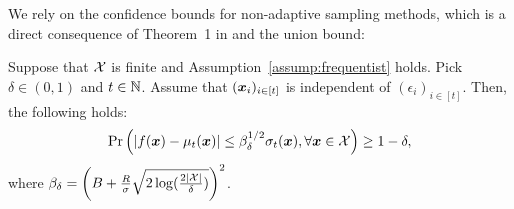We rely on the confidence bounds for non-adaptive sampling methods, which is a direct consequence of Theorem~1 in \citet{vakili2021-optimal} and the union bound:
\begin{lemma}
    Suppose that ${\cal X}$ is finite and Assumption~\ref{assump:frequentist} holds.
    Pick $\delta \in (0, 1)$ and $t \in \mathbb{N}$.
    Assume that $(\boldsymbol{x}_i)_{i \in [t]}$ is independent of $(\epsilon_i)_{i \in [t]}$.
    Then, the following holds:
    \begin{align*}
        \Pr \left( |f(\boldsymbol{x}) - \mu_{t}(\boldsymbol{x}) | \leq \beta^{1/2}_{\delta} \sigma_{t}(\boldsymbol{x}), \forall \boldsymbol{x} \in {\cal X} \right)
        \geq 1 - \delta,
    \end{align*}
    where $\beta_{\delta} = \left( B + \frac{R}{\sigma} \sqrt{2 \log ( \frac{2 |{\cal X}|}{\delta})} \right)^2$.
    \label{lem:bound_vakili}
\end{lemma}


